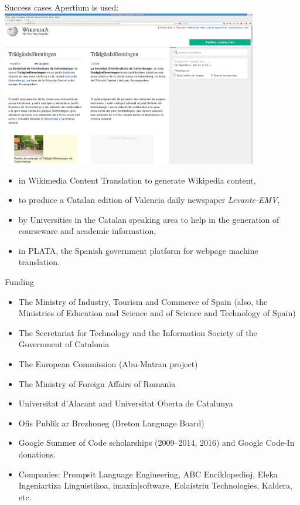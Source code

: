 \documentclass[final]{beamer} %
\newlength{\wideitemsep}
\let\olditem\item
\renewcommand{\item}{\setlength{\itemsep}{\wideitemsep}\olditem}
\begin{document}
\begin{frame}
\begin{columns}
\begin{column}{0.5\textwidth}
\begin{block}{Success cases}
Apertium is used:
\flushright	
\includegraphics[width=0.84\textwidth]{Images/captura-mediawiki.png}
\flushleft
\begin{itemize}
\item in Wikimedia Content Translation to generate Wikipedia content,
\item to produce a Catalan edition of Valencia daily newspaper \textit{Levante-EMV},
\item by Universities in the Catalan speaking area to help in the generation of courseware and academic information,
\item in PLATA, the Spanish government platform for webpage machine translation.
\end{itemize}
\end{block}

\begin{block}{Funding}
\begin{itemize}
\item The Ministry of Industry, Tourism and Commerce of Spain (also,
  the Ministries of Education and Science and of Science
  and Technology of Spain)
\item The Secretariat for Technology and the Information Society of the Government of Catalonia
\item The European Commission (Abu-Matran project)
\item The Ministry of Foreign Affairs of Romania
\item Universitat d'Alacant and Universitat Oberta de Catalunya
\item Ofis Publik ar Brezhoneg (Breton Language Board)
\item Google Summer of Code scholarships (2009--2014, 2016) and Google Code-In donations.
\item Companies: Prompsit Language Engineering, ABC Enciklopedioj, Eleka Ingeniartiza Linguistikoa, imaxin|software, Eolaistriu Technologies, Kaldera, etc.

\end{itemize} 
\end{block}


\end{column}
\end{columns}
\end{frame}
\end{document}
